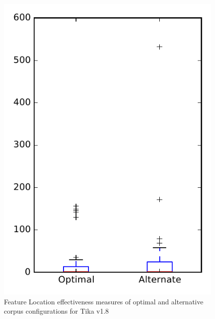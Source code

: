 
\begin{figure}
\centering
\includegraphics[height=0.4\textheight]{figures/combo/flt_rq2_tika}
\caption{Feature Location effectiveness measures of optimal and alternative corpus configurations for Tika v1.8}
\label{fig:combo:flt:rq2:tika}
\end{figure}

